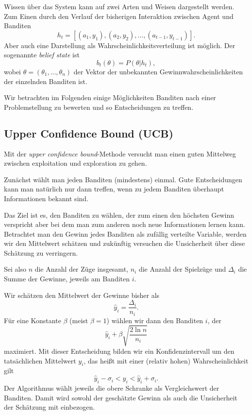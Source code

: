 \documentclass[ngerman]{../LaTeX-Templates/Paper/paper}
\begin{document}
Wissen über das System kann auf zwei Arten und Weisen dargestellt werden. Zum Einen durch den Verlauf der bisherigen Interaktion zwischen Agent und Banditen
\begin{equation*}
	h_t=[(a_1,y_1),(a_2,y_2),\ldots,(a_{t-1},y_{t-1})].
\end{equation*}
Aber auch eine Darstellung als Wahrscheinlichkeitsverteilung ist möglich. Der sogenannte \emph{belief state} ist
\begin{equation*}
	b_t(\theta)=P(\theta|h_t),
\end{equation*}
wobei $\theta=(\theta_1,\ldots,\theta_n)$ der Vektor der unbekannten Gewinnwahrscheinlichkeiten der einzelnden Banditen ist.




Wir betrachten im Folgenden einige Möglichkeiten Banditen nach einer Problemstellung zu bewerten und so Entscheidungen zu treffen.
\subsection{Upper Confidence Bound (UCB)}
Mit der \emph{upper confidence bound}-Methode versucht man einen guten Mittelweg zwischen exploitation und exploration zu gehen. 

Zunächst wählt man jeden Banditen (mindestens) einmal. Gute Entscheidungen kann man natürlich nur dann treffen, wenn zu jedem Banditen überhaupt Informationen bekannt sind. 

Das Ziel ist es, den Banditen zu wählen, der zum einen den höchsten Gewinn verspricht aber bei dem man zum anderen noch neue Informationen lernen kann.
Betrachtet man den Gewinn jedes Banditen als zufällig verteilte Variable, werden wir den Mittelwert schätzen und zukünftig versuchen die Unsicherheit über diese Schätzung zu verringern.

Sei also $n$ die Anzahl der Züge insgesamt, $n_i$ die Anzahl der Spielzüge und $\Delta_i$ die Summe der Gewinne, jeweils am Banditen $i$.

Wir schätzen den Mittelwert der Gewinne bisher als
\begin{equation*}
	\hat y_i=\frac{\Delta_i}{n_i}.
\end{equation*}
Für eine Konstante $\beta$ (meist $\beta=1$) wählen wir dann den Banditen $i$, der
\begin{equation*}
	\hat y_i+\beta \sqrt{\frac{2\ln n}{n_i}}
\end{equation*}
maximiert. 
Mit dieser Entscheidung bilden wir ein Konfidenzintervall um den tatsächlichen Mittelwert $y_i$, das heißt mit einer (relativ hohen) Wahrscheinlichkeit gilt
\begin{equation*}
	\hat y_i-\sigma_i<y_i<\hat y_i+\sigma_i.
\end{equation*}
Der Algorithmus wählt jeweils die obere Schranke als Vergleichswert der Banditen. Damit wird sowohl der geschätzte Gewinn als auch die Unsicherheit der Schätzung mit einbezogen.
\end{document}
